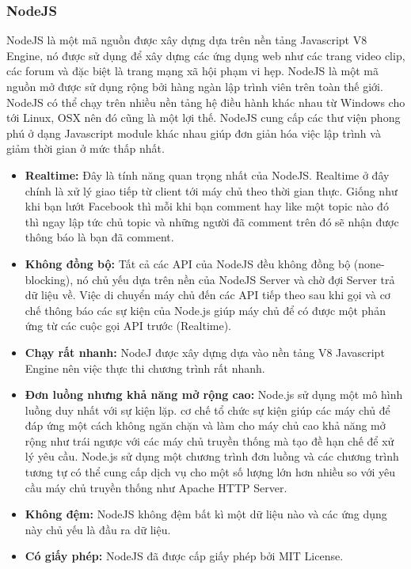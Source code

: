 \subsubsection{NodeJS}

\begin{center}
  \captionsetup{type=figure}
  
\end{center}


NodeJS là một mã nguồn được xây dựng dựa trên nền tảng Javascript V8 Engine, nó được sử dụng để xây dựng các ứng dụng web như các trang video clip, các forum và đặc biệt là trang mạng xã hội phạm vi hẹp. NodeJS là một mã nguồn mở được sử dụng rộng bởi hàng ngàn lập trình viên trên toàn thế giới. NodeJS có thể chạy trên nhiều nền tảng hệ điều hành khác nhau từ Windows cho tới Linux, OSX nên đó cũng là một lợi thế. NodeJS cung cấp các thư viện phong phú ở dạng Javascript module khác nhau giúp đơn giản hóa việc lập trình và giảm thời gian ở mức thấp nhất.


\begin{itemize}
  \item \textbf{Realtime:} Đây là tính năng quan trọng nhất của NodeJS. Realtime ở đây chính là xử lý giao tiếp từ client tới máy chủ theo thời gian thực. Giống như khi bạn lướt Facebook thì mỗi khi bạn comment hay like một topic nào đó thì ngay lập tức chủ topic và những người đã comment trên đó sẽ nhận được thông báo là bạn đã comment.
  \item \textbf{Không đồng bộ:} Tất cả các API của NodeJS đều không đồng bộ (none-blocking), nó chủ yếu dựa trên nền của NodeJS Server và chờ đợi Server trả dữ liệu về. Việc di chuyển máy chủ đến các API tiếp theo sau khi gọi và cơ chế thông báo các sự kiện của Node.js giúp máy chủ để có được một phản ứng từ các cuộc gọi API trước (Realtime).
  \item \textbf{Chạy rất nhanh:} NodeJ được xây dựng dựa vào nền tảng V8 Javascript Engine nên việc thực thi chương trình rất nhanh.
  \item \textbf{Đơn luồng nhưng khả năng mở rộng cao:} Node.js sử dụng một mô hình luồng duy nhất với sự kiện lặp. cơ chế tổ chức sự kiện giúp các máy chủ để đáp ứng một cách không ngăn chặn và làm cho máy chủ cao khả năng mở rộng như trái ngược với các máy chủ truyền thống mà tạo đề hạn chế để xử lý yêu cầu. Node.js sử dụng một chương trình đơn luồng và các chương trình tương tự có thể cung cấp dịch vụ cho một số lượng lớn hơn nhiều so với yêu cầu máy chủ truyền thống như Apache HTTP Server.
  \item \textbf{Không đệm:} NodeJS không đệm bất kì một dữ liệu nào và các ứng dụng này chủ yếu là đầu ra dữ liệu.
  \item \textbf{Có giấy phép:} NodeJS đã được cấp giấy phép bởi MIT License.
\end{itemize}

